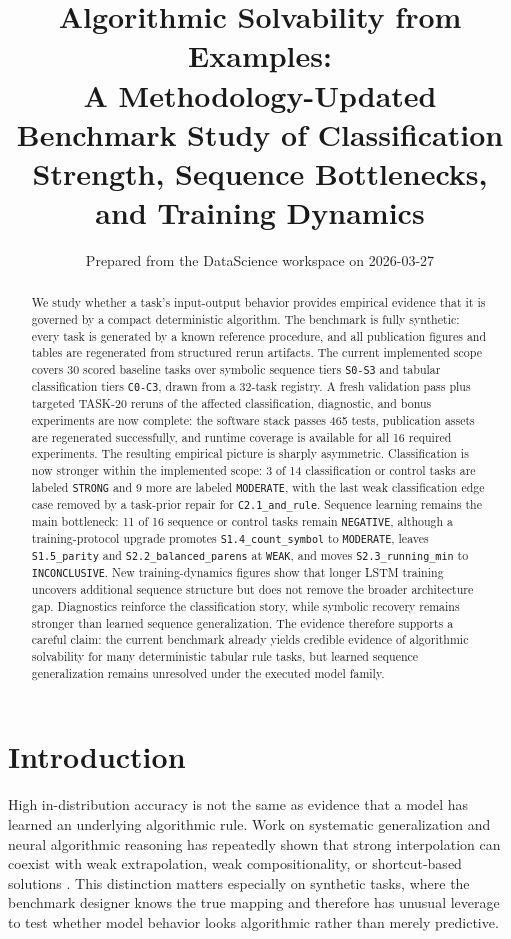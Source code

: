 \documentclass[11pt]{article}
\title{Algorithmic Solvability from Examples:\\A Methodology-Updated Benchmark Study of Classification Strength, Sequence Bottlenecks, and Training Dynamics}
\author{Prepared from the DataScience workspace on 2026-03-27}
\date{}
\begin{document}
\maketitle

\begin{abstract}
We study whether a task's input-output behavior provides empirical evidence that it is governed by a compact deterministic algorithm. The benchmark is fully synthetic: every task is generated by a known reference procedure, and all publication figures and tables are regenerated from structured rerun artifacts. The current implemented scope covers 30 scored baseline tasks over symbolic sequence tiers \texttt{S0-S3} and tabular classification tiers \texttt{C0-C3}, drawn from a 32-task registry. A fresh validation pass plus targeted TASK-20 reruns of the affected classification, diagnostic, and bonus experiments are now complete: the software stack passes 465 tests, publication assets are regenerated successfully, and runtime coverage is available for all 16 required experiments. The resulting empirical picture is sharply asymmetric. Classification is now stronger within the implemented scope: 3 of 14 classification or control tasks are labeled \texttt{STRONG} and 9 more are labeled \texttt{MODERATE}, with the last weak classification edge case removed by a task-prior repair for \texttt{C2.1\_and\_rule}. Sequence learning remains the main bottleneck: 11 of 16 sequence or control tasks remain \texttt{NEGATIVE}, although a training-protocol upgrade promotes \texttt{S1.4\_count\_symbol} to \texttt{MODERATE}, leaves \texttt{S1.5\_parity} and \texttt{S2.2\_balanced\_parens} at \texttt{WEAK}, and moves \texttt{S2.3\_running\_min} to \texttt{INCONCLUSIVE}. New training-dynamics figures show that longer LSTM training uncovers additional sequence structure but does not remove the broader architecture gap. Diagnostics reinforce the classification story, while symbolic recovery remains stronger than learned sequence generalization. The evidence therefore supports a careful claim: the current benchmark already yields credible evidence of algorithmic solvability for many deterministic tabular rule tasks, but learned sequence generalization remains unresolved under the executed model family.
\end{abstract}

\section{Introduction}

High in-distribution accuracy is not the same as evidence that a model has learned an underlying algorithmic rule. Work on systematic generalization and neural algorithmic reasoning has repeatedly shown that strong interpolation can coexist with weak extrapolation, weak compositionality, or shortcut-based solutions \cite{lake2018scan,kim2020cogs,velickovic2021nar,velickovic2022clrs}. This distinction matters especially on synthetic tasks, where the benchmark designer knows the true mapping and therefore has unusual leverage to test whether model behavior looks algorithmic rather than merely predictive.
\end{document}
